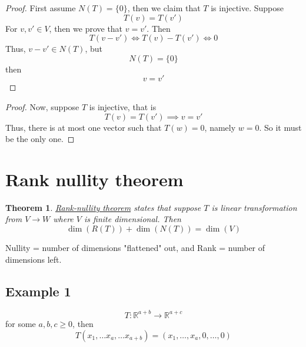 \documentclass{article}
\newtheorem{theorem}{Theorem}[section]
\newtheorem{one minute paper}[theorem]{One Minute Paper}
\begin{document}
\begin{proof}
    First assume $N(T) = \{0\}$, then we claim that $T$ is injective. Suppose 
    \begin{equation}
        T(v) = T(v')
    \end{equation}
    For $v, v' \in V$, then we prove that $v = v'$. Then
    \begin{equation}
        T(v - v') \iff T(v) - T(v') \iff 0
    \end{equation}
    Thus, $v - v' \in N(T)$, but 
    \begin{equation}
        N(T) = \{0\}
    \end{equation}
    then 
    \begin{equation}
        v = v'
    \end{equation}
\end{proof}

\begin{proof}
    Now, suppose $T$ is injective, that is 
    \begin{equation}
        T(v) = T(v') \implies v = v'
    \end{equation}
    Thus, there is at most one vector such that $T(w) = 0$, namely $w = 0$. So it must be the only one. 
\end{proof}

\section*{Rank nullity theorem}

\begin{theorem}
    \underline{Rank-nullity theorem} states that suppose $T$ is linear transformation from $V \rightarrow W$ where $V$ is finite dimensional. Then 
    \begin{equation}
        \dim(R(T)) + \dim(N(T)) = \dim(V)
    \end{equation} 
\end{theorem}

Nullity = number of dimensions "flattened" out, and Rank = number of dimensions left.

\subsection*{Example 1}

\begin{equation}
    T: \mathbb{R}^{a+b} \rightarrow \mathbb{R}^{a+c}
\end{equation}
for some $a,b,c \geq 0$, then 
\begin{equation}
    T(x_1, \dots x_a, \dots x_{a+b}) = (x_1, \dots, x_a, 0, \dots, 0)
\end{equation}
\end{document}
